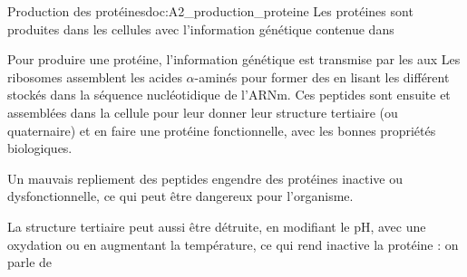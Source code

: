 \newpage
\vspace*{-36pt}
\begin{doc}{Production des protéines}{doc:A2_production_proteine}
  Les protéines sont produites dans les cellules avec l'information génétique contenue dans 
  
  Pour produire une protéine, l'information génétique est transmise par les  aux 
  Les ribosomes assemblent les acides $\alpha$-aminés pour former des  en lisant les différent  stockés dans la séquence nucléotidique de l'ARNm.
  Ces peptides sont ensuite  et assemblées dans la cellule pour leur donner leur structure tertiaire (ou quaternaire) et en faire une protéine fonctionnelle, avec les bonnes propriétés biologiques.

  Un mauvais repliement des peptides engendre des protéines inactive ou dysfonctionnelle, ce qui peut être dangereux pour l'organisme.

  La structure tertiaire peut aussi être détruite, en modifiant le pH, avec une oxydation ou en augmentant la température, ce qui rend inactive la protéine : on parle de 
\end{doc}

